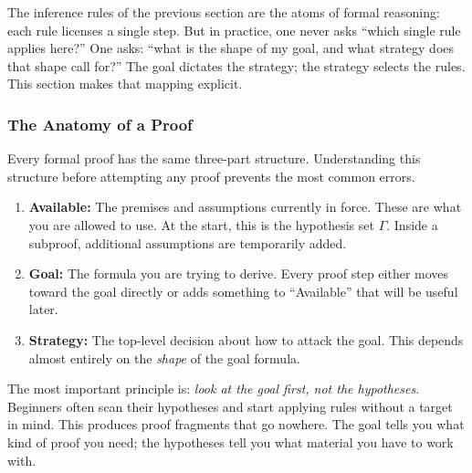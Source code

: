 The inference rules of the previous section are the atoms of formal reasoning:
each rule licenses a single step. But in practice, one never asks ``which
single rule applies here?'' One asks: ``what is the shape of my goal, and what
strategy does that shape call for?'' The goal dictates the strategy; the
strategy selects the rules. This section makes that mapping explicit.


\subsubsection*{The Anatomy of a Proof}

Every formal proof has the same three-part structure. Understanding this
structure before attempting any proof prevents the most common errors.

\begin{tcolorbox}[colback=propbox, colframe=propborder, arc=2pt,
  left=6pt, right=6pt, top=4pt, bottom=4pt,
  title={\small\textbf{The Three-Part Structure of a Proof}},
  fonttitle=\small\bfseries]
\begin{enumerate}[label=(\roman*)]
\item \textbf{Available:} The premises and assumptions currently in force.
  These are what you are allowed to use. At the start, this is the hypothesis
  set $\Gamma$. Inside a subproof, additional assumptions are temporarily added.
\item \textbf{Goal:} The formula you are trying to derive. Every proof step
  either moves toward the goal directly or adds something to ``Available'' that
  will be useful later.
\item \textbf{Strategy:} The top-level decision about how to attack the goal.
  This depends almost entirely on the \emph{shape} of the goal formula.
\end{enumerate}
\end{tcolorbox}

The most important principle is: \emph{look at the goal first, not the
hypotheses}. Beginners often scan their hypotheses and start applying rules
without a target in mind. This produces proof fragments that go nowhere. The
goal tells you what kind of proof you need; the hypotheses tell you what
material you have to work with.


